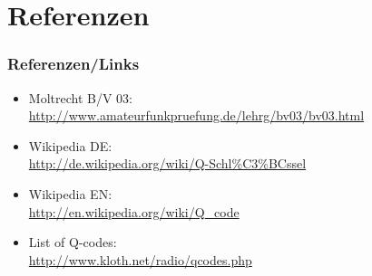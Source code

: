 \section*{Referenzen}

\begin{frame}
    \frametitle{Referenzen/Links}
    
    \footnotesize
    \begin{itemize}
        \item Moltrecht B/V 03: \\
              \url{http://www.amateurfunkpruefung.de/lehrg/bv03/bv03.html}
        \item Wikipedia DE: \\
              \url{http://de.wikipedia.org/wiki/Q-Schl\%C3\%BCssel}
        \item Wikipedia EN: \\
              \url{http://en.wikipedia.org/wiki/Q_code}
        \item List of Q-codes: \\
              \url{http://www.kloth.net/radio/qcodes.php}
    \end{itemize}

\end{frame}


